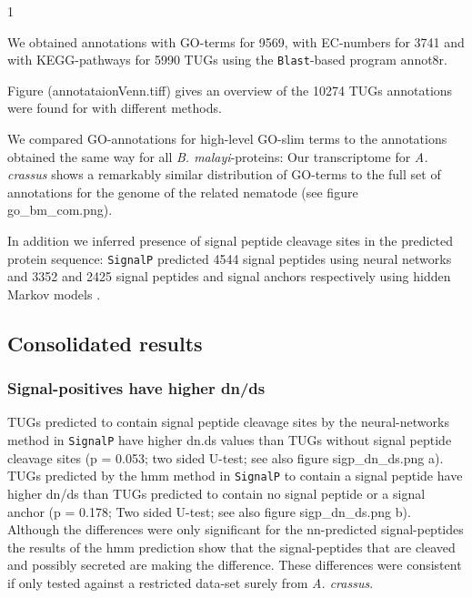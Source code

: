 \documentclass[10pt]{bmc_article}
\newenvironment{bmcformat}{\begin{raggedright}\baselineskip20pt\sloppy\setboolean{publ}{false}}{\end{raggedright}\baselineskip20pt\sloppy}
\begin{document}
\begin{bmcformat}



\begin{Schunk}
\begin{Soutput}
[1] 1
\end{Soutput}
\end{Schunk}


We obtained annotations with GO-terms for 9569, with EC-numbers
for 3741 and with KEGG-pathways for 5990 TUGs using
the \texttt{Blast}-based program annot8r.

Figure (annotataionVenn.tiff) gives an overview of the
10274 TUGs annotations were found for with
different methods.


We compared GO-annotations for high-level GO-slim terms to the
annotations obtained the same way for all \textit{B. malayi}-proteins:
Our transcriptome for \textit{A. crassus} shows a remarkably similar
distribution of GO-terms to the full set of annotations for the genome
of the related nematode (see figure go\_bm\_com.png).

In addition we inferred presence of signal peptide cleavage sites in
the predicted protein sequence: \texttt{SignalP} \cite{pmid17446895}
predicted 4544 signal peptides using neural networks and
3352 and 2425 signal peptides and signal anchors
respectively using hidden Markov models \cite{pmid9783217}.

\subsection*{Consolidated results}







\subsubsection*{Signal-positives have higher dn/ds}

TUGs predicted to contain signal peptide cleavage sites by the
neural-networks method in \texttt{SignalP} have higher dn.ds values
than TUGs without signal peptide cleavage sites (p =
0.053; two sided U-test; see also
figure sigp\_dn\_ds.png a). TUGs predicted by the hmm method in
\texttt{SignalP} to contain a signal peptide have higher dn/ds than
TUGs predicted to contain no signal peptide or a signal anchor (p =
0.178; Two sided U-test; see also
figure sigp\_dn\_ds.png b). Although the differences were only
significant for the nn-predicted signal-peptides the results of the
hmm prediction show that the signal-peptides that are cleaved and
possibly secreted are making the difference. These differences were
consistent if only tested against a restricted data-set surely from
\textit{A. crassus}.


\end{bmcformat}
\end{document}
